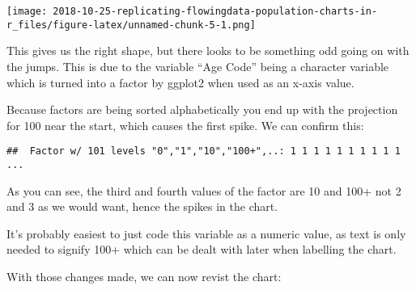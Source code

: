 \documentclass[]{article}
\newenvironment{Shaded}{\begin{snugshade}}{\end{snugshade}}
\newcommand{\KeywordTok}[1]{\textcolor[rgb]{0.13,0.29,0.53}{\textbf{#1}}}
\newcommand{\DataTypeTok}[1]{\textcolor[rgb]{0.13,0.29,0.53}{#1}}
\newcommand{\DecValTok}[1]{\textcolor[rgb]{0.00,0.00,0.81}{#1}}
\newcommand{\CharTok}[1]{\textcolor[rgb]{0.31,0.60,0.02}{#1}}
\newcommand{\StringTok}[1]{\textcolor[rgb]{0.31,0.60,0.02}{#1}}
\newcommand{\OperatorTok}[1]{\textcolor[rgb]{0.81,0.36,0.00}{\textbf{#1}}}
\newcommand{\NormalTok}[1]{#1}
\begin{document}
\texttt{[image: 2018-10-25-replicating-flowingdata-population-charts-in-r\_files/figure-latex/unnamed-chunk-5-1.png]}

This gives us the right shape, but there looks to be something odd going
on with the jumps. This is due to the variable ``Age Code'' being a
character variable which is turned into a factor by ggplot2 when used as
an x-axis value.

Because factors are being sorted alphabetically you end up with the
projection for 100 near the start, which causes the first spike. We can
confirm this:

\begin{Shaded}
\end{Shaded}

\begin{verbatim}
##  Factor w/ 101 levels "0","1","10","100+",..: 1 1 1 1 1 1 1 1 1 1 ...
\end{verbatim}

As you can see, the third and fourth values of the factor are 10 and
100+ not 2 and 3 as we would want, hence the spikes in the chart.

It's probably easiest to just code this variable as a numeric value, as
text is only needed to signify 100+ which can be dealt with later when
labelling the chart.

\begin{Shaded}
\end{Shaded}

With those changes made, we can now revist the chart:

\begin{Shaded}
\end{Shaded}
\end{document}
